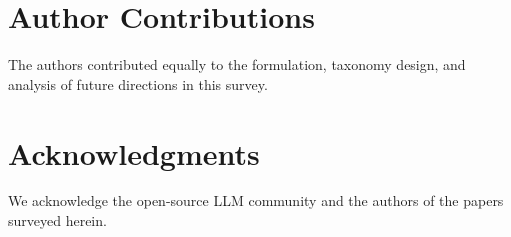 \documentclass{article} %
\begin{document}
\section*{Author Contributions}
The authors contributed equally to the formulation, taxonomy design, and analysis of future directions in this survey.

\section*{Acknowledgments}
We acknowledge the open-source LLM community and the authors of the papers surveyed herein.



\end{document}
